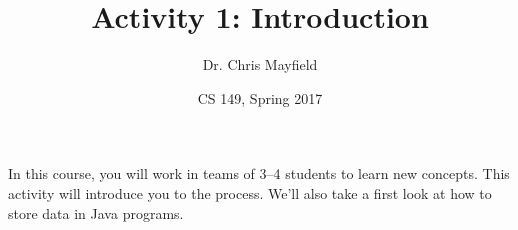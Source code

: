 \documentclass[12pt]{article}
\title{Activity 1: Introduction}
\author{Dr. Chris Mayfield}
\date{CS 149, Spring 2017}
\begin{document}
\maketitle

In this course, you will work in teams of 3--4 students to learn new concepts.
This activity will introduce you to the process.
We'll also take a first look at how to store data in Java programs.





\end{document}
